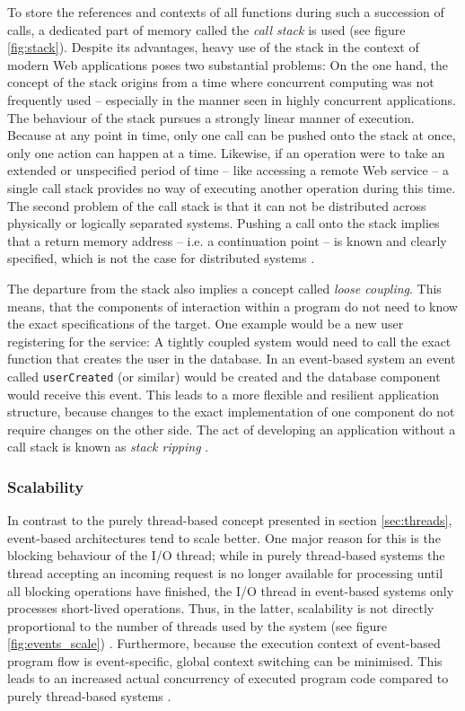 To store the references and contexts of all functions during such a succession of calls, a dedicated part of memory called the \textit{call stack} is used (see figure \ref{fig:stack}). Despite its advantages, heavy use of the stack in the context of modern Web applications poses two substantial problems: On the one hand, the concept of the stack origins from a time where concurrent computing was not frequently used -- especially in the manner seen in highly concurrent applications. The behaviour of the stack pursues a strongly linear manner of execution. Because at any point in time, only one call can be pushed onto the stack at once, only one action can happen at a time. Likewise, if an operation were to take an extended or unspecified period of time -- like accessing a remote Web service -- a single call stack provides no way of executing another operation during this time. The second problem of the call stack is that it can not be distributed across physically or logically separated systems. Pushing a call onto the stack implies that a return memory address -- i.e. a continuation point -- is known and clearly specified, which is not the case for distributed systems \cite{Hohpe2006}. 

The departure from the stack also implies a concept called \textit{loose coupling}. This means, that the components of interaction within a program do not need to know the exact specifications of the target. One example would be a new user registering for the service: A tightly coupled system would need to call the exact function that creates the user in the database. In an event-based system an event called \texttt{userCreated} (or similar) would be created and the database component would receive this event. This leads to a more flexible and resilient application structure, because changes to the exact implementation of one component do not require changes on the other side. The act of developing an application without a call stack is known as \textit{stack ripping} \cite{Drolia2010}.

\subsubsection*{Scalability}
In contrast to the purely thread-based concept presented in section \ref{sec:threads}, event-based architectures tend to scale better. One major reason for this is the blocking behaviour of the I/O thread; while in purely thread-based systems the thread accepting an incoming request is no longer available for processing until all blocking operations have finished, the I/O thread in event-based systems only processes short-lived operations. Thus, in the latter, scalability is not directly proportional to the number of threads used by the system (see figure \ref{fig:events_scale}) \cite[p. 2]{Carrera}. Furthermore, because the execution context of event-based program flow is event-specific, global context switching can be minimised. This leads to an increased actual concurrency of executed program code compared to purely thread-based systems \cite{Lee2006}.

